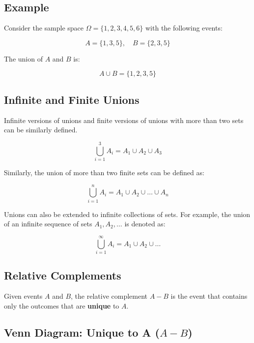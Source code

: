 \documentclass{article}
\begin{document}
\subsection*{Example}

Consider the sample space \(\Omega = \{1, 2, 3, 4, 5, 6\}\) with the following events:

\[
A = \{1, 3, 5\}, \quad B = \{2, 3, 5\}
\]

The union of \(A\) and \(B\) is:

\[
A \cup B = \{1, 2, 3, 5\}
\]


\subsection*{Infinite and Finite Unions}

Infinite versions of unions and finite versions of unions with more than two sets can be similarly defined.

\[
\bigcup_{i=1}^{3} A_i = A_1 \cup A_2 \cup A_3
\]

Similarly, the union of more than two finite sets can be defined as:

\[
\bigcup_{i=1}^{n} A_i = A_1 \cup A_2 \cup \ldots \cup A_n
\]

Unions can also be extended to infinite collections of sets. For example, the union of an infinite sequence of sets \(A_1, A_2, \ldots\) is denoted as:

\[
\bigcup_{i=1}^{\infty} A_i = A_1 \cup A_2 \cup \ldots
\]



\subsection*{Relative Complements}

Given events \(A\) and \(B\), the relative complement \(A - B\) is the event that contains only the outcomes that are \textbf{unique} to \(A\).

\subsection*{Venn Diagram: Unique to A (\(A - B\))}

\begin{center}
\end{center}
\end{document}
